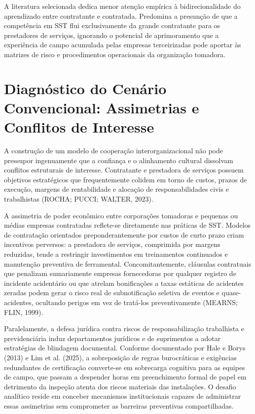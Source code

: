 \documentclass[12pt,a4paper]{article}
\begin{document}
A literatura selecionada dedica menor atenção empírica à bidirecionalidade do aprendizado entre contratante e contratada. Predomina a presunção de que a competência em SST flui exclusivamente da grande contratante para os prestadores de serviços, ignorando o potencial de aprimoramento que a experiência de campo acumulada pelas empresas terceirizadas pode aportar às matrizes de risco e procedimentos operacionais da organização tomadora.

\section{Diagnóstico do Cenário Convencional: Assimetrias e Conflitos de Interesse}

A construção de um modelo de cooperação interorganizacional não pode pressupor ingenuamente que a confiança e o alinhamento cultural dissolvam conflitos estruturais de interesse. Contratante e prestadora de serviços possuem objetivos estratégicos que frequentemente colidem em torno de custos, prazos de execução, margens de rentabilidade e alocação de responsabilidades civis e trabalhistas (ROCHA; PUCCI; WALTER, 2023).

A assimetria de poder econômico entre corporações tomadoras e pequenas ou médias empresas contratadas reflete-se diretamente nas práticas de SST. Modelos de contratação orientados preponderantemente por custos de curto prazo criam incentivos perversos: a prestadora de serviços, comprimida por margens reduzidas, tende a restringir investimentos em treinamentos continuados e manutenção preventiva de ferramental. Concomitantemente, cláusulas contratuais que penalizam sumariamente empresas fornecedoras por qualquer registro de incidente acidentário ou que atrelam bonificações a taxas estáticas de acidentes zeradas podem gerar o risco real de subnotificação seletiva de eventos e quase-acidentes, ocultando perigos em vez de tratá-los preventivamente (MEARNS; FLIN, 1999).

Paralelamente, a defesa jurídica contra riscos de responsabilização trabalhista e previdenciária induz departamentos jurídicos e de suprimentos a adotar estratégias de blindagem documental. Conforme documentado por Hale e Borys (2013) e Lim et al. (2025), a sobreposição de regras burocráticas e exigências redundantes de certificação converte-se em sobrecarga cognitiva para as equipes de campo, que passam a despender horas em preenchimento formal de papel em detrimento da inspeção atenta dos riscos materiais das instalações. O desafio analítico reside em conceber mecanismos institucionais capazes de administrar essas assimetrias sem comprometer as barreiras preventivas compartilhadas.
\end{document}
